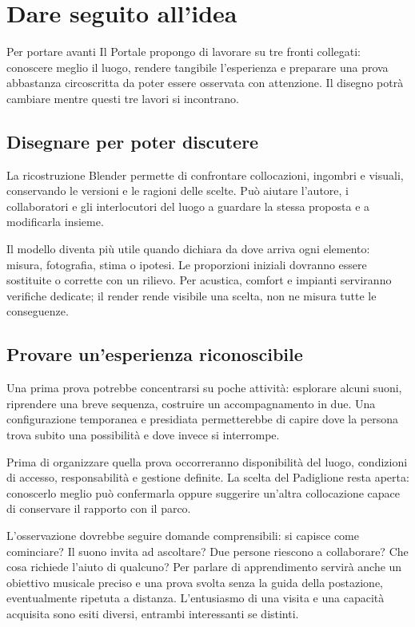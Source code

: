 \section{Dare seguito all'idea}\label{sec:future-work}

Per portare avanti Il Portale propongo di lavorare su
tre fronti collegati: conoscere meglio il luogo, rendere
tangibile l'esperienza e preparare una prova abbastanza
circoscritta da poter essere osservata con attenzione.
Il disegno potrà cambiare mentre questi tre lavori
si incontrano.

\subsection{Disegnare per poter discutere}
La ricostruzione Blender permette di confrontare
collocazioni, ingombri e visuali, conservando le versioni
e le ragioni delle scelte. Può aiutare l'autore, i
collaboratori e gli interlocutori del luogo a guardare
la stessa proposta e a modificarla insieme.

Il modello diventa più utile quando dichiara da dove
arriva ogni elemento: misura, fotografia, stima o
ipotesi. Le proporzioni iniziali dovranno essere
sostituite o corrette con un rilievo. Per acustica,
comfort e impianti serviranno verifiche dedicate;
il render rende visibile una scelta, non ne misura
tutte le conseguenze.

\subsection{Provare un'esperienza riconoscibile}
Una prima prova potrebbe concentrarsi su poche
attività: esplorare alcuni suoni, riprendere una breve
sequenza, costruire un accompagnamento in due.
Una configurazione temporanea e presidiata permetterebbe
di capire dove la persona trova subito una possibilità
e dove invece si interrompe.

Prima di organizzare quella prova occorreranno
disponibilità del luogo, condizioni di accesso,
responsabilità e gestione definite. La scelta del
Padiglione resta aperta: conoscerlo meglio può
confermarla oppure suggerire un'altra collocazione
capace di conservare il rapporto con il parco.

L'osservazione dovrebbe seguire domande comprensibili:
si capisce come cominciare? Il suono invita ad
ascoltare? Due persone riescono a collaborare?
Che cosa richiede l'aiuto di qualcuno? Per parlare
di apprendimento servirà anche un obiettivo musicale
preciso e una prova svolta senza la guida della
postazione, eventualmente ripetuta a distanza.
L'entusiasmo di una visita e una capacità acquisita
sono esiti diversi, entrambi interessanti se distinti.

